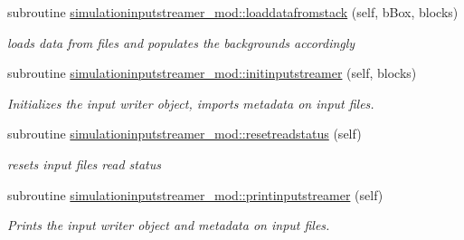 \begin{DoxyCompactItemize}
subroutine \mbox{\hyperlink{namespacesimulationinputstreamer__mod_a3d4540f8e04cc0215895cad65c5be952}{simulationinputstreamer\+\_\+mod\+::loaddatafromstack}} (self, b\+Box, blocks)
\begin{DoxyCompactList}\small\item\em loads data from files and populates the backgrounds accordingly \end{DoxyCompactList}\item 
subroutine \mbox{\hyperlink{namespacesimulationinputstreamer__mod_a9f81731f839f49c42a281c1334f528da}{simulationinputstreamer\+\_\+mod\+::initinputstreamer}} (self, blocks)
\begin{DoxyCompactList}\small\item\em Initializes the input writer object, imports metadata on input files. \end{DoxyCompactList}\item 
subroutine \mbox{\hyperlink{namespacesimulationinputstreamer__mod_a9465e29f527366e5f6d9a1195de6ddee}{simulationinputstreamer\+\_\+mod\+::resetreadstatus}} (self)
\begin{DoxyCompactList}\small\item\em resets input files read status \end{DoxyCompactList}\item 
subroutine \mbox{\hyperlink{namespacesimulationinputstreamer__mod_a1b906bc5ba1fac8d846b30237216aca4}{simulationinputstreamer\+\_\+mod\+::printinputstreamer}} (self)
\begin{DoxyCompactList}\small\item\em Prints the input writer object and metadata on input files. \end{DoxyCompactList}\end{DoxyCompactItemize}
